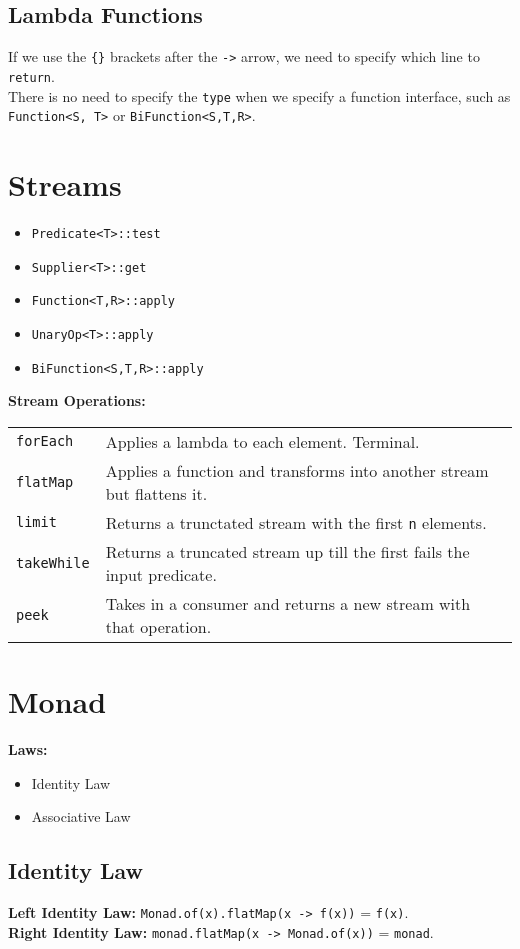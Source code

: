 \documentclass[10pt,landscape,a4paper]{article}
\begin{document}
\begin{multicols*}{4}
\subsection{Lambda Functions}
If we use the \texttt{\{\}} brackets after the \texttt{->} arrow, we need to specify which line to \texttt{return}. \\
There is no need to specify the \texttt{type} when we specify a function interface, such as \texttt{Function<S, T>} or \texttt{BiFunction<S,T,R>}.

\section{Streams}
\begin{itemize}
    \item \texttt{Predicate<T>::test}
    \item \texttt{Supplier<T>::get}
    \item \texttt{Function<T,R>::apply}
    \item \texttt{UnaryOp<T>::apply}
    \item \texttt{BiFunction<S,T,R>::apply}
\end{itemize}
\textbf{Stream Operations:} \\
\begin{tabular}{p{1.5cm}p{4.8cm}}
    \verb!forEach!  &   Applies a lambda to each element. Terminal. \\
    \verb!flatMap!  &   Applies a function and transforms into another stream but flattens it.  \\
    \verb!limit!    &   Returns a trunctated stream with the first \texttt{n} elements. \\
    \verb!takeWhile!    &   Returns a truncated stream up till the first fails the input predicate. \\
    \verb!peek!     &   Takes in a consumer and returns a new stream with that operation. \\
\end{tabular}

\section{Monad}
\textbf{Laws:}
\begin{itemize}
    \item Identity Law
    \item Associative Law
\end{itemize}

\subsection{Identity Law}
\textbf{Left Identity Law:} \texttt{Monad.of(x).flatMap(x -> f(x))} = \texttt{f(x)}. \\
\textbf{Right Identity Law:} \texttt{monad.flatMap(x -> Monad.of(x))} = \texttt{monad}.


\end{multicols*}
\end{document}
